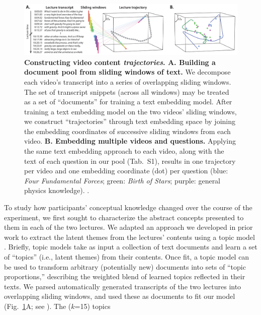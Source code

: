 \documentclass[10pt]{article}
\newcommand{\questions}{S1}
\begin{document}
\begin{figure}[tp]
\centering
\includegraphics[width=\textwidth]{figs/sliding_windows}

\caption{\textbf{Constructing video content \textit{trajectories}. \textbf{A}.
Building a document pool from sliding windows of text.} We decompose each
video's transcript into a series of overlapping sliding windows. The set of
transcript snippets (across all windows) may be treated as a set of
``documents'' for training a text embedding model. After training a text
embedding model on the two videos' sliding windows, we construct ``trajectories''
through text embedding space by joining the embedding coordinates of successive
sliding windows from each video. \textbf{B. Embedding multiple videos and
questions.} Applying the same text embedding approach to each video, along with
the text of each question in our pool (Tab.~\questions), results in one trajectory per video and one
embedding coordinate (dot) per question (blue: \textit{Four Fundamental
Forces}; green: \textit{Birth of Stars}; purple: general physics knowledge). .}

\label{fig:sliding-windows}
\end{figure}

To study how participants' conceptual knowledge changed over the course of the experiment, 
we first sought to characterize the abstract concepts presented to them in each of the two 
lectures. We adapted an approach we developed in prior work \citep{HeusEtal21} to extract 
the latent themes from the lectures' contents using a topic model \citep{BleiEtal03}. Briefly, 
topic models take as input a collection of text documents and learn a set of ``topics'' (i.e., 
latent themes) from their contents. Once fit, a topic model can be used to transform arbitrary 
(potentially new) documents into sets of ``topic proportions,'' describing the weighted blend 
of learned topics reflected in their texts. We parsed automatically generated transcripts of 
the two lectures into overlapping sliding windows, and used these as documents to fit our 
model (Fig.~\ref{fig:sliding-windows}A; see \textit{}).
The ($k$=15) topics 
\end{document}
